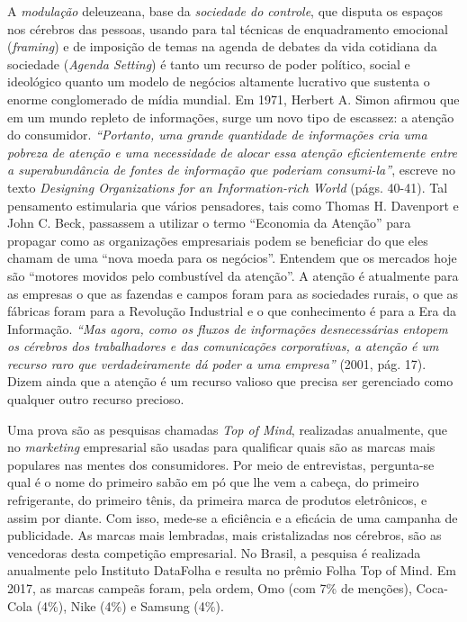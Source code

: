 A \emph{modulação} deleuzeana, base da \emph{sociedade do controle}, que
disputa os espaços nos cérebros das pessoas, usando para tal técnicas de
enquadramento emocional (\emph{framing}) e de imposição de temas na
agenda de debates da vida cotidiana da sociedade (\emph{Agenda Setting})
é tanto um recurso de poder político, social e ideológico quanto um
modelo de negócios altamente lucrativo que sustenta o enorme
conglomerado de mídia mundial. Em 1971, Herbert A. Simon afirmou que em
um mundo repleto de informações, surge um novo tipo de escassez: a
atenção do consumidor. \emph{``Portanto, uma grande quantidade de
informações cria uma pobreza de atenção e uma necessidade de alocar essa
atenção eficientemente entre a superabundância de fontes de informação
que poderiam consumi-la''}, escreve no texto \emph{Designing
Organizations for an Information-rich World} (págs. 40-41). Tal
pensamento estimularia que vários pensadores, tais como Thomas H.
Davenport e John C. Beck, passassem a utilizar o termo ``Economia da
Atenção'' para propagar como as organizações empresariais podem se
beneficiar do que eles chamam de uma ``nova moeda para os negócios''.
Entendem que os mercados hoje são ``motores movidos pelo combustível da
atenção''. A atenção é atualmente para as empresas o que as fazendas e
campos foram para as sociedades rurais, o que as fábricas foram para a
Revolução Industrial e o que conhecimento é para a Era da Informação.
\emph{``Mas agora, como os fluxos de informações desnecessárias entopem
os cérebros dos trabalhadores e das comunicações corporativas, a atenção
é um recurso raro que verdadeiramente dá poder a uma empresa''} (2001,
pág. 17). Dizem ainda que a atenção é um recurso valioso que precisa ser
gerenciado como qualquer outro recurso precioso.

Uma prova são as pesquisas chamadas \emph{Top of Mind}, realizadas
anualmente, que no \emph{marketing} empresarial são usadas para
qualificar quais são as marcas mais populares nas mentes dos
consumidores. Por meio de entrevistas, pergunta-se qual é o nome do
primeiro sabão em pó que lhe vem a cabeça, do primeiro refrigerante, do
primeiro tênis, da primeira marca de produtos eletrônicos, e assim por
diante. Com isso, mede-se a eficiência e a eficácia de uma campanha de
publicidade. As marcas mais lembradas, mais cristalizadas nos cérebros,
são as vencedoras desta competição empresarial. No Brasil, a pesquisa é
realizada anualmente pelo Instituto DataFolha e resulta no prêmio Folha
Top of Mind. Em 2017, as marcas campeãs foram, pela ordem, Omo (com 7\%
de menções), Coca-Cola (4\%), Nike (4\%) e Samsung (4\%).

